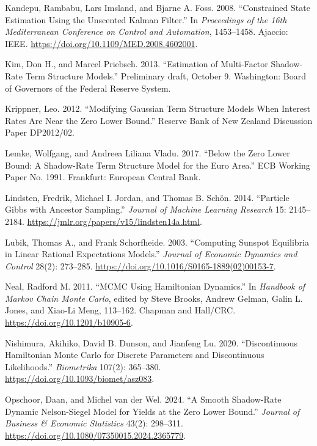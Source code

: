 \documentclass[11pt]{article}
\begin{document}
\begin{list}{}{\setlength{\leftmargin}{2em}\setlength{\itemindent}{-2em}\setlength{\itemsep}{2pt}\setlength{\parsep}{0pt}}
\item Kandepu, Rambabu, Lars Imsland, and Bjarne A. Foss. 2008. ``Constrained State Estimation Using the Unscented Kalman Filter.'' In \emph{Proceedings of the 16th Mediterranean Conference on Control and Automation}, 1453--1458. Ajaccio: IEEE. \url{https://doi.org/10.1109/MED.2008.4602001}.

\item Kim, Don H., and Marcel Priebsch. 2013. ``Estimation of Multi-Factor Shadow-Rate Term Structure Models.'' Preliminary draft, October 9. Washington: Board of Governors of the Federal Reserve System.

\item Krippner, Leo. 2012. ``Modifying Gaussian Term Structure Models When Interest Rates Are Near the Zero Lower Bound.'' Reserve Bank of New Zealand Discussion Paper DP2012/02.

\item Lemke, Wolfgang, and Andreea Liliana Vladu. 2017. ``Below the Zero Lower Bound: A Shadow-Rate Term Structure Model for the Euro Area.'' ECB Working Paper No. 1991. Frankfurt: European Central Bank.

\item Lindsten, Fredrik, Michael I. Jordan, and Thomas B. Sch\"on. 2014. ``Particle Gibbs with Ancestor Sampling.'' \emph{Journal of Machine Learning Research} 15: 2145--2184. \url{https://jmlr.org/papers/v15/lindsten14a.html}.

\item Lubik, Thomas A., and Frank Schorfheide. 2003. ``Computing Sunspot Equilibria in Linear Rational Expectations Models.'' \emph{Journal of Economic Dynamics and Control} 28(2): 273--285. \url{https://doi.org/10.1016/S0165-1889(02)00153-7}.

\item Neal, Radford M. 2011. ``MCMC Using Hamiltonian Dynamics.'' In \emph{Handbook of Markov Chain Monte Carlo}, edited by Steve Brooks, Andrew Gelman, Galin L. Jones, and Xiao-Li Meng, 113--162. Chapman and Hall/CRC. \url{https://doi.org/10.1201/b10905-6}.

\item Nishimura, Akihiko, David B. Dunson, and Jianfeng Lu. 2020. ``Discontinuous Hamiltonian Monte Carlo for Discrete Parameters and Discontinuous Likelihoods.'' \emph{Biometrika} 107(2): 365--380. \url{https://doi.org/10.1093/biomet/asz083}.

\item Opschoor, Daan, and Michel van der Wel. 2024. ``A Smooth Shadow-Rate Dynamic Nelson-Siegel Model for Yields at the Zero Lower Bound.'' \emph{Journal of Business \& Economic Statistics} 43(2): 298--311. \url{https://doi.org/10.1080/07350015.2024.2365779}.


\end{list}
\end{document}
